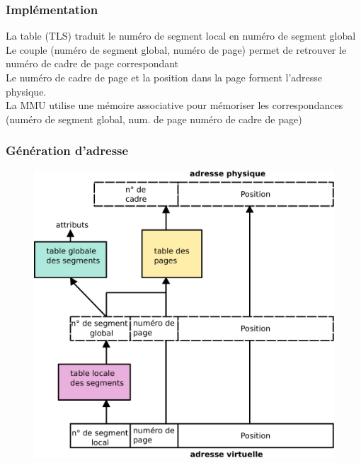 \begin{frame}
  \frametitle{Implémentation}
  La table (TLS) traduit le numéro de segment local en numéro de segment global\\
  \vspace{0.5cm}
  Le couple \alert{(numéro de segment global, numéro de page)} permet de retrouver le numéro de
  cadre de page correspondant \\
  \vspace{0.5cm}
  Le numéro de cadre de page et la position dans la page forment l'adresse 
  physique.\\
  \vspace{0.5cm}
  La MMU utilise une \alert{mémoire associative} pour mémoriser les
  correspondances \\
  
  \alert{(numéro de segment global, num. de page  numéro de cadre de page)}
\end{frame}

\begin{frame}
  \frametitle{Génération d'adresse}
  \vspace{-0.3cm}
  \begin{figure}
    \includegraphics[width=0.7\linewidth]{fig2/generation-mv}
  \end{figure}
\end{frame}

